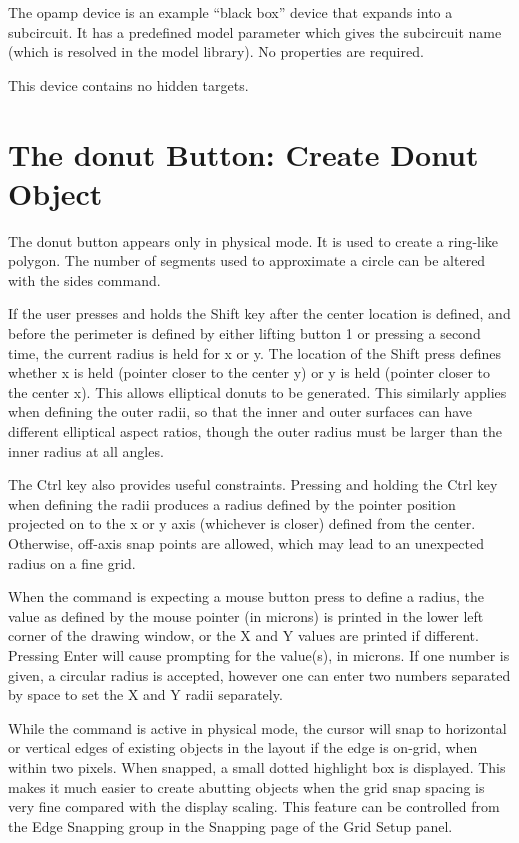The {\et opamp} device is an example ``black box'' device that expands
into a subcircuit.  It has a predefined {\et model} parameter which
gives the subcircuit name (which is resolved in the model library). 
No properties are required.

This device contains no hidden targets.


\section{The {\cb donut} Button: Create Donut Object}

The {\cb donut} button appears only in physical mode.  It is used to
create a ring-like polygon.  The number of segments used to
approximate a circle can be altered with the {\cb sides} command.

If the user presses and holds the {\kb Shift} key after the center
location is defined, and before the perimeter is defined by either
lifting button 1 or pressing a second time, the current radius is held
for x or y.  The location of the {\kb Shift} press defines whether x
is held (pointer closer to the center y) or y is held (pointer closer
to the center x).  This allows elliptical donuts to be generated. 
This similarly applies when defining the outer radii, so that the
inner and outer surfaces can have different elliptical aspect ratios,
though the outer radius must be larger than the inner radius at all
angles. 

The {\kb Ctrl} key also provides useful constraints.  Pressing and
holding the {\kb Ctrl} key when defining the radii produces a radius
defined by the pointer position projected on to the x or y axis
(whichever is closer) defined from the center.  Otherwise, off-axis
snap points are allowed, which may lead to an unexpected radius on a
fine grid.

When the command is expecting a mouse button press to define a radius,
the value as defined by the mouse pointer (in microns) is printed in
the lower left corner of the drawing window, or the X and Y values are
printed if different.  Pressing {\kb Enter} will cause prompting for
the value(s), in microns.  If one number is given, a circular radius
is accepted, however one can enter two numbers separated by space to
set the X and Y radii separately.

While the command is active in physical mode, the cursor will snap to
horizontal or vertical edges of existing objects in the layout if the
edge is on-grid, when within two pixels.  When snapped, a small dotted
highlight box is displayed.  This makes it much easier to create
abutting objects when the grid snap spacing is very fine compared with
the display scaling.  This feature can be controlled from the {\cb
Edge Snapping} group in the {\cb Snapping} page of the {\cb Grid
Setup} panel.

